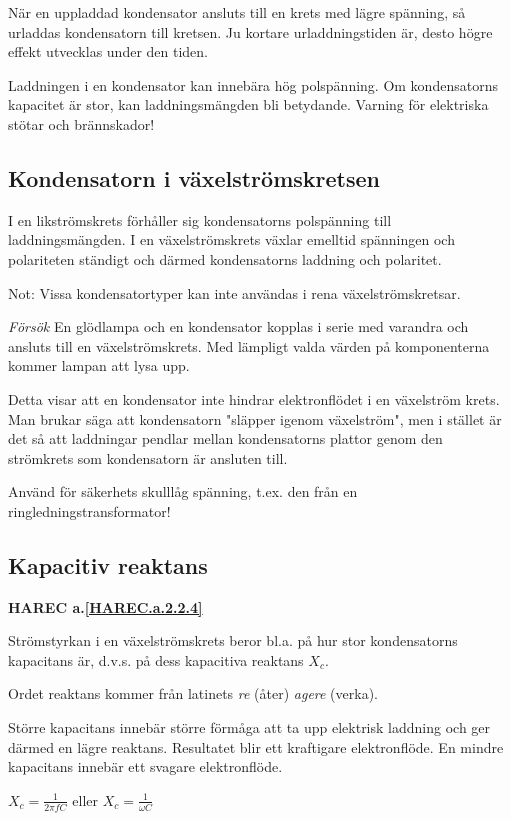 När en uppladdad kondensator ansluts till en krets med lägre spänning, så
urladdas kondensatorn till kretsen. Ju kortare urladdningstiden är, desto högre
effekt utvecklas under den tiden.

Laddningen i en kondensator kan innebära hög polspänning. Om kondensatorns
kapacitet är stor, kan laddningsmängden bli betydande. Varning för elektriska
stötar och brännskador!

\subsection{Kondensatorn i växelströmskretsen}

I en likströmskrets förhåller sig kondensatorns polspänning till
laddningsmängden. I en växelströmskrets växlar emelltid spänningen och
polariteten ständigt och därmed kondensatorns laddning och polaritet.

Not: Vissa kondensatortyper kan inte användas i rena växelströmskretsar.

\emph{Försök}
En glödlampa och en kondensator kopplas i serie med varandra och ansluts till en
växelströmskrets. Med lämpligt valda värden på komponenterna kommer lampan att
lysa upp.

Detta visar att en kondensator inte hindrar elektronflödet i en växelström
krets. Man brukar säga att kondensatorn "släpper igenom växelström", men i
stället är det så att laddningar pendlar mellan kondensatorns plattor genom den
strömkrets som kondensatorn är ansluten till.

Använd för säkerhets skulllåg spänning, t.ex. den från en
ringledningstransformator!

\subsection{Kapacitiv reaktans}
\textbf{HAREC a.\ref{HAREC.a.2.2.4}\label{myHAREC.a.2.2.4}}

Strömstyrkan i en växelströmskrets beror bl.a. på hur stor kondensatorns
kapacitans är, d.v.s. på dess kapacitiva reaktans \(X_c\).

Ordet reaktans kommer från latinets \emph{re} (åter) \emph{agere} (verka).

Större kapacitans innebär större förmåga att ta upp elektrisk laddning och ger
därmed en lägre reaktans. Resultatet blir ett kraftigare elektronflöde.
En mindre kapacitans innebär ett svagare elektronflöde.

\(X_c = \frac{1}{2πfC}\) eller \(X_c = \frac{1}{\omega C}\)

